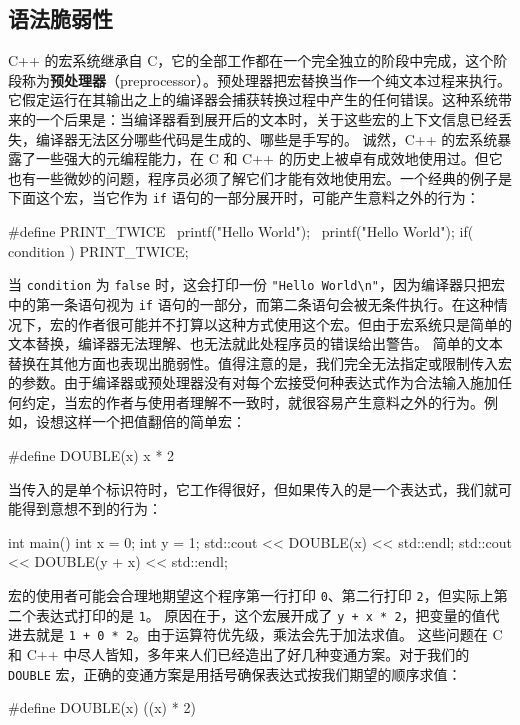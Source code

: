 \subsection{语法脆弱性}
\label{idx:idx_650811c0}
\label{idx:idx_31f7287c}
C++ 的宏系统继承自 C，它的全部工作都在一个完全独立的阶段中完成，这个阶段称为\textbf{预处理器}（preprocessor）。预处理器把宏替换当作一个纯文本过程来执行。它假定运行在其输出之上的编译器会捕获转换过程中产生的任何错误。这种系统带来的一个后果是：当编译器看到展开后的文本时，关于这些宏的上下文信息已经丢失，编译器无法区分哪些代码是生成的、哪些是手写的。
诚然，C++ 的宏系统暴露了一些强大的元编程能力，在 C 和 C++ 的历史上被卓有成效地使用过。但它也有一些微妙的问题，程序员必须了解它们才能有效地使用宏。一个经典的例子是下面这个宏，当它作为 \texttt{if} 语句的一部分展开时，可能产生意料之外的行为：
\begin{codebox}[text]
#define PRINT_TWICE \
    printf("Hello World\n"); \
    printf("Hello World\n");
if( condition )
    PRINT_TWICE;
\end{codebox}
当 \texttt{condition} 为 \texttt{false} 时，这会打印一份 \texttt{"Hello World\textbackslash{}n"}，因为编译器只把宏中的第一条语句视为 \texttt{if} 语句的一部分，而第二条语句会被无条件执行。在这种情况下，宏的作者很可能并不打算以这种方式使用这个宏。但由于宏系统只是简单的文本替换，编译器无法理解、也无法就此处程序员的错误给出警告。
\label{idx:idx_d126c1db}
简单的文本替换在其他方面也表现出脆弱性。值得注意的是，我们完全无法指定或限制传入宏的参数。由于编译器或预处理器没有对每个宏接受何种表达式作为合法输入施加任何约定，当宏的作者与使用者理解不一致时，就很容易产生意料之外的行为。例如，设想这样一个把值翻倍的简单宏：
\begin{codebox}[text]
#define DOUBLE(x) x * 2
\end{codebox}
当传入的是单个标识符时，它工作得很好，但如果传入的是一个表达式，我们就可能得到意想不到的行为：
\begin{codebox}[rust]
int main() {
   int x = 0;
   int y = 1;
   std::cout << DOUBLE(x) << std::endl;
   std::cout << DOUBLE(y + x) << std::endl;
}
\end{codebox}
宏的使用者可能会合理地期望这个程序第一行打印 \texttt{0}、第二行打印 \texttt{2}，但实际上第二个表达式打印的是 \texttt{1}。
原因在于，这个宏展开成了 \texttt{y + x * 2}，把变量的值代进去就是 \texttt{1 + 0 * 2}。由于运算符优先级，乘法会先于加法求值。
这些问题在 C 和 C++ 中尽人皆知，多年来人们已经造出了好几种变通方案。对于我们的 \texttt{DOUBLE} 宏，正确的变通方案是用括号确保表达式按我们期望的顺序求值：
\begin{codebox}[text]
#define DOUBLE(x) ((x) * 2)
\end{codebox}
